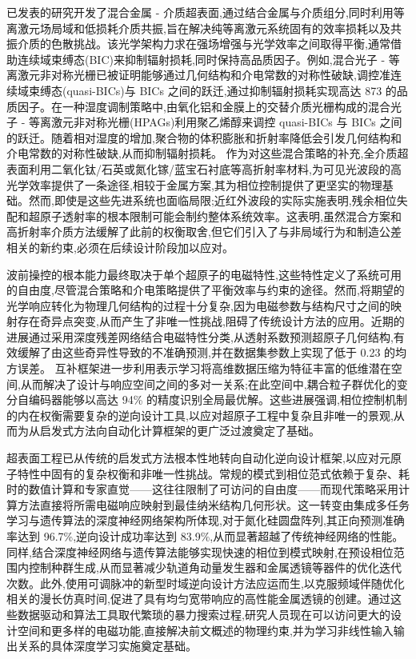 \documentclass[11pt]{article}
\begin{document}
已发表的研究开发了混合金属 - 介质超表面,通过结合金属与介质组分,同时利用等离激元场局域和低损耗介质共振,旨在解决纯等离激元系统固有的效率损耗以及共振介质的色散挑战。该光学架构力求在强场增强与光学效率之间取得平衡,通常借助连续域束缚态(BIC)来抑制辐射损耗,同时保持高品质因子。例如,混合光子 - 等离激元非对称光栅已被证明能够通过几何结构和介电常数的对称性破缺,调控准连续域束缚态(quasi-BICs)与 BICs 之间的跃迁,通过抑制辐射损耗实现高达 873 的品质因子。在一种湿度调制策略中,由氧化铝和金膜上的交替介质光栅构成的混合光子 - 等离激元非对称光栅(HPAGs)利用聚乙烯醇来调控 quasi-BICs 与 BICs 之间的跃迁。随着相对湿度的增加,聚合物的体积膨胀和折射率降低会引发几何结构和介电常数的对称性破缺,从而抑制辐射损耗。\citep{doi_10_1002_adpr_202400191_88f03cd9} 作为对这些混合策略的补充,全介质超表面利用二氧化钛/石英或氮化镓/蓝宝石衬底等高折射率材料,为可见光波段的高光学效率提供了一条途径,相较于金属方案,其为相位控制提供了更坚实的物理基础。然而,即使是这些先进系统也面临局限;近红外波段的实际实施表明,残余相位失配和超原子透射率的根本限制可能会制约整体系统效率。这表明,虽然混合方案和高折射率介质方法缓解了此前的权衡取舍,但它们引入了与非局域行为和制造公差相关的新约束,必须在后续设计阶段加以应对。\citep{doi_10_1002_adpr_202400191_88f03cd9} \citep{doi_10_1063_5_0141881_93942631}

波前操控的根本能力最终取决于单个超原子的电磁特性,这些特性定义了系统可用的自由度,尽管混合策略和介电策略提供了平衡效率与约束的途径。然而,将期望的光学响应转化为物理几何结构的过程十分复杂,因为电磁参数与结构尺寸之间的映射存在奇异点突变,从而产生了非唯一性挑战,阻碍了传统设计方法的应用。近期的进展通过采用深度残差网络结合电磁特性分类,从透射系数预测超原子几何结构,有效缓解了由这些奇异性导致的不准确预测,并在数据集参数上实现了低于 0.23 的均方误差。\citep{doi_10_1109_iccem60619_2024_10559188_c3199408} \citep{doi_10_1109_isctis58954_2023_10213114_7fee3b45} 互补框架进一步利用表示学习将高维数据压缩为特征丰富的低维潜在空间,从而解决了设计与响应空间之间的多对一关系;在此空间中,耦合粒子群优化的变分自编码器能够以高达 94\% 的精度识别全局最优解。这些进展强调,相位控制机制的内在权衡需要复杂的逆向设计工具,以应对超原子工程中复杂且非唯一的景观,从而为从启发式方法向自动化计算框架的更广泛过渡奠定了基础。\citep{doi_10_1109_iccem60619_2024_10559188_c3199408} \citep{doi_10_2139_ssrn_4082312_28ca582d}

超表面工程已从传统的启发式方法根本性地转向自动化逆向设计框架,以应对元原子特性中固有的复杂权衡和非唯一性挑战。常规的模式到相位范式依赖于复杂、耗时的数值计算和专家直觉------这往往限制了可访问的自由度------而现代策略采用计算方法直接将所需电磁响应映射到最佳纳米结构几何形状。这一转变由集成多任务学习与遗传算法的深度神经网络架构所体现,对于氮化硅圆盘阵列,其正向预测准确率达到 96.7\%,逆向设计成功率达到 83.9\%,从而显著超越了传统神经网络的性能。同样,结合深度神经网络与遗传算法能够实现快速的相位到模式映射,在预设相位范围内控制种群生成,从而显著减少轨道角动量发生器和金属透镜等器件的优化迭代次数。此外,使用可调脉冲的新型时域逆向设计方法应运而生,以克服频域伴随优化相关的漫长仿真时间,促进了具有均匀宽带响应的高性能金属透镜的创建。通过这些数据驱动和算法工具取代繁琐的暴力搜索过程,研究人员现在可以访问更大的设计空间和更多样的电磁功能,直接解决前文概述的物理约束,并为学习非线性输入输出关系的具体深度学习实施奠定基础。\citep{doi_10_1016_j_rio_2026_100988_b00ee173} \citep{doi_10_1364_oe_478084_bf365dc5} \citep{doi_10_1109_apmc60911_2024_10867828_7c3f3b13}
\end{document}
